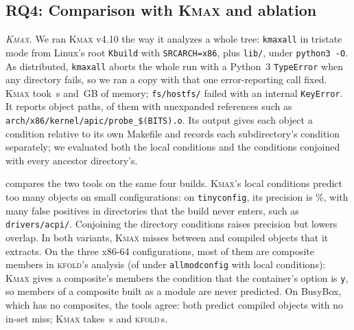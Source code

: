 \documentclass[acmsmall,screen,review]{acmart}
\newcommand{\tool}{\textsc{kfold}\xspace}
\newcommand{\kmax}{\textsc{Kmax}\xspace}
\begin{document}
\subsection{RQ4: Comparison with \kmax and ablation}
\label{sec:eval:kmax}
\emph{\kmax.} We ran \kmax v4.10 the way it analyzes a whole tree: \texttt{kmaxall} in tristate mode from Linux's root \texttt{Kbuild} with \texttt{SRCARCH=x86}, plus \texttt{lib/}, under \texttt{python3 -O}. As distributed, \texttt{kmaxall} aborts the whole run with a Python~3 \texttt{TypeError} when any directory fails, so we ran a copy with that one error-reporting call fixed. \kmax took \NLinuxKmaxSeconds\,s and \NLinuxKmaxRssGb\,GB of memory; \texttt{fs/hostfs/} failed with an internal \texttt{KeyError}. It reports \NLinuxKmaxObjects object paths, \NLinuxKmaxUnexpanded of them with unexpanded references such as \texttt{arch/x86/kernel/apic/probe\_\$(BITS).o}. Its output gives each object a condition relative to its own Makefile and records each subdirectory's condition separately; we evaluated both the local conditions and the conditions conjoined with every ancestor directory's.

 compares the two tools on the same four builds. \kmax's local conditions predict too many objects on small configurations: on \texttt{tinyconfig}, its precision is \NLinuxKmaxTinyconfigLocalPrec\%, with many false positives in directories that the build never enters, such as \texttt{drivers/acpi/}. Conjoining the directory conditions raises precision but lowers overlap. In both variants, \kmax misses between \NLinuxKmaxTinyconfigLocalFn and \NLinuxKmaxAllmodconfigWithDirsFn compiled objects that it extracts. On the three x86-64 configurations, most of them are composite members in \tool's analysis (\NLinuxKmaxAllmodconfigLocalFnMembers of \NLinuxKmaxAllmodconfigLocalFn under \texttt{allmodconfig} with local conditions): \kmax gives a composite's members the condition that the container's option is \texttt{y}, so members of a composite built as a module are never predicted. On BusyBox, which has no composites, the tools agree: both predict \NBusyboxKmaxDefconfigLocalTp compiled objects with no in-set miss; \kmax takes \NBusyboxKmaxSeconds\,s and \tool \NBusyboxSeconds\,s.
\end{document}
